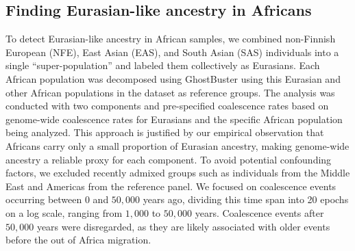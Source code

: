 \begin{table}[h!]
\begin{subtable}{\textwidth}
\centering
{}
\caption{}
\label{tab:african_populations_2}
\end{subtable}

\caption{\textbf{Sub-Saharan African populations analyzed.} (a) Modern samples and, (b) Ancient samples}
\label{tab:african_populations}
\end{table}


\subsection{Finding Eurasian-like ancestry in Africans}

To detect Eurasian-like ancestry in African samples, we combined non-Finnish European (NFE), East Asian (EAS), and South Asian (SAS) individuals into a single ``super-population'' and labeled them collectively as Eurasians. Each African population was decomposed using GhostBuster using this Eurasian and other African populations in the dataset as reference groups. The analysis was conducted with two components and pre-specified coalescence rates based on genome-wide coalescence rates for Eurasians and the specific African population being analyzed. This approach is justified by our empirical observation that Africans carry only a small proportion of Eurasian ancestry, making genome-wide ancestry a reliable proxy for each component. To avoid potential confounding factors, we excluded recently admixed groups such as individuals from the Middle East and Americas from the reference panel. We focused on coalescence events occurring between 0 and $50{,}000$ years ago, dividing this time span into 20 epochs on a log scale, ranging from $1{,}000$ to $50{,}000$ years. Coalescence events after $50{,}000$ years were disregarded, as they are likely associated with older events before the out of Africa migration. 

